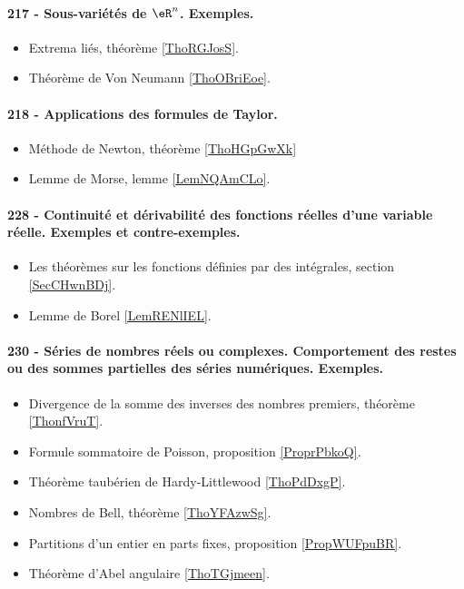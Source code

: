 \paragraph{217 - Sous-variétés de \( \eR^n\). Exemples.}
\begin{itemize}
    \item Extrema liés, théorème \ref{ThoRGJosS}.
    \item Théorème de Von Neumann \ref{ThoOBriEoe}.
\end{itemize}
\paragraph{218 - Applications des formules de Taylor.}
\begin{itemize}
    \item Méthode de Newton, théorème \ref{ThoHGpGwXk}
    \item Lemme de Morse, lemme \ref{LemNQAmCLo}.
\end{itemize}
\paragraph{228 - Continuité et dérivabilité des fonctions réelles d’une variable réelle. Exemples et contre-exemples.}
\begin{itemize}
    \item Les théorèmes sur les fonctions définies par des intégrales, section \ref{SecCHwnBDj}.
    \item Lemme de Borel \ref{LemRENlIEL}.
\end{itemize}
\paragraph{230 - Séries de nombres réels ou complexes. Comportement des restes ou des sommes partielles des séries numériques. Exemples.}
\begin{itemize}
    \item Divergence de la somme des inverses des nombres premiers, théorème \ref{ThonfVruT}.
    \item Formule sommatoire de Poisson, proposition \ref{ProprPbkoQ}.
    \item Théorème taubérien de Hardy-Littlewood \ref{ThoPdDxgP}.
    \item Nombres de Bell, théorème \ref{ThoYFAzwSg}.
    \item Partitions d'un entier en parts fixes, proposition \ref{PropWUFpuBR}.
    \item Théorème d'Abel angulaire \ref{ThoTGjmeen}.
\end{itemize}
